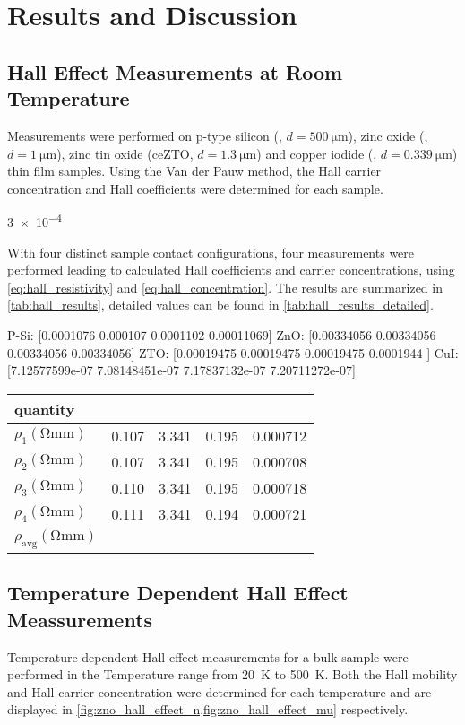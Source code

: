 \section{Results and Discussion}
\subsection{Hall Effect Measurements at Room Temperature}
Measurements were performed on p-type silicon (, $d=\qty{500}{\micro\meter}$), 
zinc oxide (, $d=\qty{1}{\micro\meter}$), zinc tin oxide (ce{ZTO}, 
$d=\qty{1.3}{\micro\meter}$) and copper iodide (, $d=\qty{0.339}{\micro\meter}$) 
thin film samples.
Using the Van der Pauw method, the Hall carrier concentration and Hall coefficients were
determined for each sample.

\num{3e-4}

With four distinct sample contact configurations, four measurements were performed 
leading to calculated Hall coefficients and carrier concentrations, using 
\cref{eq:hall_resistivity} and \cref{eq:hall_concentration}.
The results are summarized in \cref{tab:hall_results}, detailed values can be found in 
\cref{tab:hall_results_detailed}.

P-Si: [0.0001076  0.000107   0.0001102  0.00011069]
ZnO: [0.00334056 0.00334056 0.00334056 0.00334056]
ZTO: [0.00019475 0.00019475 0.00019475 0.0001944 ]
CuI: [7.12577599e-07 7.08148451e-07 7.17837132e-07 7.20711272e-07]
\begin{tabular}{lllll}
	\toprule
	quantity & \ce{p-Si} & \ce{ZnO} & \ce{ZTO} & \ce{CuI} \\
	\midrule
	$\rho_1 (\unit{\ohm \milli \meter})$ & 0.107 & 3.341 & 0.195 & 0.000712 \\
	$\rho_2 (\unit{\ohm \milli \meter})$ & 0.107 & 3.341 & 0.195 & 0.000708 \\
	$\rho_3 (\unit{\ohm \milli \meter})$ & 0.110 & 3.341 & 0.195 & 0.000718 \\
	$\rho_4 (\unit{\ohm \milli \meter})$ & 0.111 & 3.341 & 0.194 & 0.000721 \\
	$\rho_\mathrm{avg} (\unit{\ohm\milli \meter})$
\end{tabular}


\subsection{Temperature Dependent Hall Effect Meassurements}
Temperature dependent Hall effect measurements for a bulk  sample 
were performed in the Temperature range from \qty{20}{\kelvin} to \qty{500}{\kelvin}.
Both the Hall mobility and Hall carrier concentration were determined for each temperature and are displayed in 
\cref{fig:zno_hall_effect_n,fig:zno_hall_effect_mu} respectively.

